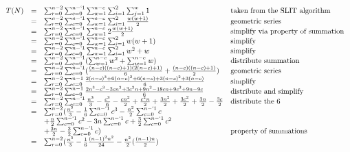 \documentclass[12pt]{article}
\begin{document}
\begin{enumerate}
    \begin{math}
        \begin{array}{llll}
            T(N) & = & \sum_{r=0}^{n-2} \sum_{c=0}^{n-`1} \sum_{w=1}^{n-c} \sum_{i=1}^2 \sum_{j=1}^w 1 & \text{taken from the SLIT algorithm} \\
            & = & \sum_{r=0}^{n-2} \sum_{c=0}^{n-`1} \sum_{w=1}^{n-c} \sum_{i=1}^2 \frac{w(w+1)}{2} & \text{geometric series} \\
            & = & \sum_{r=0}^{n-2} \sum_{c=0}^{n-`1} \sum_{w=1}^{n-c} 2 \frac{w(w+1)}{2} & \text{simplify via property of summation} \\
            & = & \sum_{r=0}^{n-2} \sum_{c=0}^{n-`1} \sum_{w=1}^{n-c} \sum_{i=1}^2 w(w+1) & \text{simplify}\\
            & = & \sum_{r=0}^{n-2} \sum_{c=0}^{n-`1} \sum_{w=1}^{n-c} \sum_{i=1}^2 w^2 + w & \text{simplify} \\
            & = & \sum_{r=0}^{n-2} \sum_{c=0}^{n-`1} (\sum_{w=1}^{n-c} w^2 + \sum_{w=1}^{n-c} w) & \text{distribute summation} \\
            & = & \sum_{r=0}^{n-2} \sum_{c=0}^{n-`1} (\frac{(n-c)((n-c) +1)(2(n-c)+1)}{6} + \frac{(n-c)((n-c)+1)}{2}) & \text{geometric series} \\
            & = & \sum_{r=0}^{n-2} \sum_{c=0}^{n-1} \frac{2(n-c)^3+6(n-c)^2+6(n-c)+3(n-c)^2+3(n-c)}{6} & \text{simplify}\\
            & = & \sum_{r=0}^{n-2} \sum_{c=0}^{n-1} \frac{2n^3-c^3-3cn^2+3c^2n+9n^2-18cn+9c^2+9n-9c}{6} & \text{distribute and simplify}\\
            & = & \sum_{r=0}^{n-2} \sum_{c=0}^{n-`1} \frac{n^3}{3} - \frac{c^3}{6} - \frac{cn^2}{2} + \frac{c^2n}{2} + \frac{3n^2}{2} + \frac{3c^2}{2} + \frac{3n}{2} - \frac{3c}{2} & \text{distribute the 6}\\
            & = & \sum_{r=0}^{n-2} (\frac{n^3}{3} - \frac{1}{6}\sum_{c=0}^{n-`1} c^3 - \frac{n^2}{2}\sum_{c=0}^{n-`1} c \\
            && + \frac{n}{2} \sum_{c=0}^{n-`1} c^2 - 3n\sum_{c=0}^{n-`1} c + \frac{3}{2}\sum_{c=0}^{n-`1} c^2 \\
            && + \frac{3n}{2} - \frac{3}{2}\sum_{c=0}^{n-`1} c) & \text{property of summations} \\
            & = & \sum_{r=0}^{n-2} (\frac{n^3}{3} - \frac{1}{6} \frac{(n-1)^2n^2}{24} - \frac{n^2}{2}(\frac{(n-1)n}{2})\\

\end{array}
\end{math}
\end{enumerate}
\end{document}

